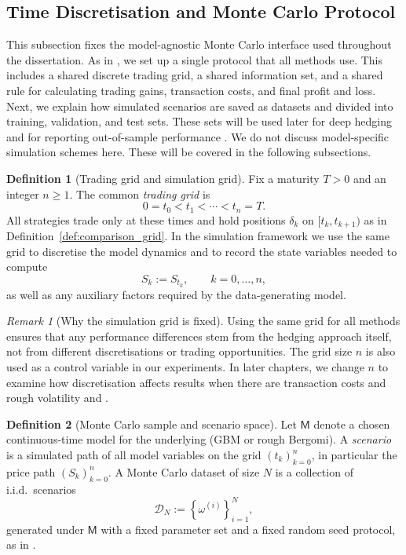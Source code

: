 \documentclass[12pt,a4paper]{article}
\theoremstyle{definition}
\newtheorem{definition}{Definition}[section]
\theoremstyle{plain}
\theoremstyle{remark}
\newtheorem{remark}{Remark}[section]
\theoremstyle{plain}
\begin{document}
\subsection{Time Discretisation and Monte Carlo Protocol}
\label{subsec:mc_protocol}

This subsection fixes the model-agnostic Monte Carlo interface used throughout the dissertation. 
As in \cite{Buehler2019DeepHedging}, we set up a single protocol that all methods use. This includes a shared discrete trading grid, a shared information set, and a shared rule for calculating trading gains, transaction costs, and final profit and loss.
Next, we explain how simulated scenarios are saved as datasets and divided into training, validation, and test sets. These sets will be used later for deep hedging and for reporting out-of-sample performance \cite{Buehler2019DeepHedging,Horvath2021DeepRough}.
We do not discuss model-specific simulation schemes here. These will be covered in the following subsections.

\begin{definition}[Trading grid and simulation grid]
\label{def:sim_grid}
Fix a maturity $T>0$ and an integer $n\ge 1$. 
The common \emph{trading grid} is
\[
0=t_0<t_1<\cdots<t_n=T.
\]
All strategies trade only at these times and hold positions $\delta_k$ on $[t_k,t_{k+1})$ as in Definition~\ref{def:comparison_grid}. 
In the simulation framework we use the same grid to discretise the model dynamics and to record the state variables needed to compute
\[
S_k:=S_{t_k},\qquad k=0,\dots,n,
\]
as well as any auxiliary factors required by the data-generating model.
\end{definition}

\begin{remark}[Why the simulation grid is fixed]
\label{rem:fixed_grid}
Using the same grid for all methods ensures that any performance differences stem from the hedging approach itself, not from different discretisations or trading opportunities.
The grid size $n$ is also used as a control variable in our experiments. In later chapters, we change $n$ to examine how discretisation affects results when there are transaction costs and rough volatility \cite{Buehler2019DeepHedging} and \cite{Horvath2021DeepRough}.
\end{remark}

\begin{definition}[Monte Carlo sample and scenario space]
\label{def:mc_sample}
Let $\mathsf{M}$ denote a chosen continuous-time model for the underlying (GBM or rough Bergomi). 
A \emph{scenario} is a simulated path of all model variables on the grid $(t_k)_{k=0}^n$, in particular the price path $(S_k)_{k=0}^n$. 
A Monte Carlo dataset of size $N$ is a collection of i.i.d.\ scenarios
\[
\mathcal{D}_N := \left\{\omega^{(i)}\right\}_{i=1}^N,
\]
generated under $\mathsf{M}$ with a fixed parameter set and a fixed random seed protocol, as in \cite{Buehler2019DeepHedging}.
\end{definition}
\end{document}

